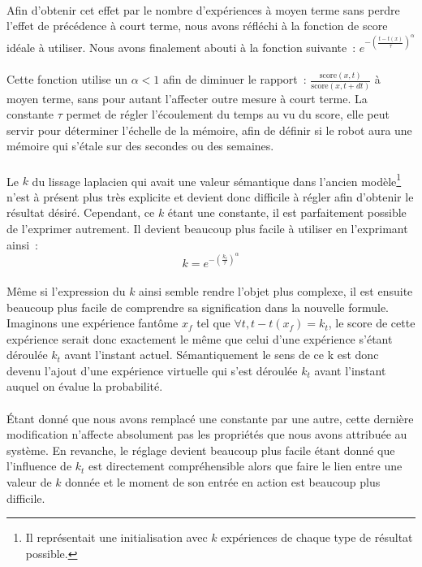 \paragraph{}
Afin d'obtenir cet effet par le nombre d'expériences à moyen terme sans perdre
l'effet de précédence à court terme, nous avons réfléchi à la fonction de
score idéale à utiliser. Nous avons finalement abouti à la fonction suivante~:
$e^{-(\frac{t-t(x)}{\tau})^{\alpha}}$

\paragraph{}
Cette fonction utilise un $\alpha < 1$ afin de diminuer le rapport~:
$\frac{\mathrm{score}(x,t)}{\mathrm{score}(x, t + dt)}$ à moyen terme, sans
pour autant l'affecter outre mesure à court terme. La constante $\tau$ permet
de régler l'écoulement du temps au vu du score, elle peut servir pour
déterminer l'échelle de la mémoire, afin de définir si le robot aura une
mémoire qui s'étale sur des secondes ou des semaines.


\paragraph{}
Le $k$ du lissage laplacien qui avait une valeur sémantique dans l'ancien
modèle\footnote{Il représentait une initialisation avec $k$ expériences de
chaque type de résultat possible.} n'est à présent plus très explicite et
devient donc difficile à régler afin d'obtenir le résultat désiré. Cependant,
ce $k$ étant une constante, il est parfaitement possible de l'exprimer
autrement. Il devient beaucoup plus facile à utiliser en l'exprimant ainsi~:
$$k = e^{-\left (\frac{k_t}{\tau} \right )^{\alpha}}$$

\paragraph{}
Même si l'expression du $k$ ainsi semble rendre l'objet plus complexe, il est
ensuite beaucoup plus facile de comprendre sa signification dans la nouvelle
formule. Imaginons une expérience fantôme $x_f$ tel que
$\forall t, t - t(x_f) = k_t$, le score de cette expérience serait donc
exactement le même que celui d'une expérience s'étant déroulée $k_t$ avant
l'instant actuel. Sémantiquement le sens de ce k est donc devenu l'ajout d'une
expérience virtuelle qui s'est déroulée $k_t$ avant l'instant auquel on évalue
la probabilité.

\paragraph{}
Étant donné que nous avons remplacé une constante par une autre, cette
dernière modification n'affecte absolument pas les propriétés que nous avons
attribuée au système. En revanche, le réglage devient beaucoup plus facile
étant donné que l'influence de $k_t$ est directement compréhensible alors
que faire le lien entre une valeur de $k$ donnée et le moment de son entrée en
action est beaucoup plus difficile.

